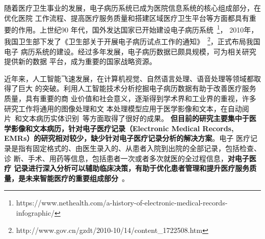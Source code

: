 \begin{comment}
我国卫生部于2010年10月下发了《卫生部关于开展电子病历试点工作的通知》
~\footnote{http://www.gov.cn/gzdt/2010-10/14/content\_1722508.htm}，在我国22个省
部分区域和医院开展电子病历试点工作，标志着我国电子病历迈入了一个新的阶段。2017年
7月，国务院《新一代人工智能发展规划》指出\textbf{智能医疗}、\textbf{智能健康和养
老}是未来智能社会的核心组成部分，使``人们能够最大限度享受高质量服务和便捷生活
''。2019年4月，国家卫生健康委和国家中医药管理局联合印发《全国基层医疗卫生机构信
息化建设标准与规范（试行）》，该《规范与标准》针对目前基层医疗卫生机构信息化建设
现状，着眼未来5\textasciitilde 10年基层医疗卫生机构信息化建设、应用和发展要求，
\textbf{鼓励基层医疗卫生机构积极推进云计算、大数据、人工智能等新兴技术应用}。在
国家的宏观部署和政策支持下，大量的研究机构和公司开始投入智能医疗研究，并积极打造
能够落地的医学人工智能应用。作为首批国家人工智能开发平台之一，腾讯觅影
~\footnote{https://miying.qq.com/official/}在癌症早筛、智能导诊和病案管理等方面
都利用人工智能技术取得了突破。为助力今年的新冠疫情，阿里巴巴达摩院开发了CT智能诊
断系统，``截止2020年2月23日，达摩院AI已对3万个临床疑似新冠肺炎病例CT影像进行了诊
断，单个病例影像分析可在20秒内完成，准确率达到
96\%''~\footnote{http://www.sh.chinanews.com/yljk/2020-02-23/71707.shtml}。越来
越多成功的智能医疗系统已陆续在医院开始应用。
\end{comment}

随着医疗卫生事业的发展，电子病历系统已成为医院信息系统的核心组成部分，在优化医院
工作流程、提高医疗服务质量和搭建区域医疗卫生平台等方面都具有重要的作用。上世纪90
年代，国外发达国家已开始建设电子病历系统~\footnote{https://www.nethealth.com/a-history-of-electronic-medical-records-infographic/}，
2010年，我国卫生部下发了《卫生部关于开展电子病历试点工作的通知》~\footnote{http://www.gov.cn/gzdt/2010-10/14/content\_1722508.htm}，正式布局我国电子
病历系统的建设。经过多年发展，电子病历数据已颇具规模，可为相关研究提供新的数据
平台，成为重要的国家战略资源。

近年来，人工智能飞速发展，在计算机视觉、自然语言处理、语音处理等领域都取得了巨大
的突破。利用人工智能技术分析挖掘电子病历数据有助于改善医疗服务质量，具有重要的商
业价值和社会意义，逐渐得到学术界和工业界的重视，许多研究工作将通用的图像处理和文
本处理模型应用于医学影像和文本，在自动阅片~和文本病历实体识别~等方面取得了很好的成果。
\textbf{但目前的研究主要集中于医学影像和文本病历，针对电子医疗记录（Electronic
Medical Records, EMRs）的研究相对较少，缺少针对电子医疗记录分析的解决方案}。电子
医疗记录是指有固定格式的、由医生录入的、从患者入院到出院的全部记录，包括检查、诊
断、手术、用药等信息，包括患者一次或者多次就医的全过程信息，\textbf{对电子医疗
记录进行深入分析可以辅助临床决策，有助于优化患者管理和提升医疗服务质量，是未来智能医疗的重要组成部分}~。

